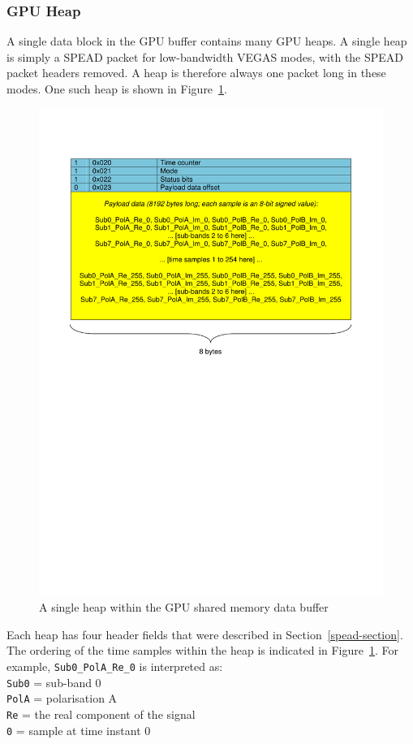 \documentclass[11pt]{article} %
\begin{document}
\subsubsection{GPU Heap}

A single data block in the GPU buffer contains many GPU heaps. A single heap is simply a SPEAD packet for low-bandwidth VEGAS modes, with the SPEAD packet headers removed. A heap is therefore always one packet long in these modes. One such heap is shown in Figure~\ref{vegas-gpu-heap}.

\begin{figure}[!ht]
\centering
\includegraphics*[width=13cm, viewport = 55 410 540 760]{figures/vegas-gpu-heap.pdf}
\caption{A single heap within the GPU shared memory data buffer}
\label{vegas-gpu-heap}
\end{figure}

Each heap has four header fields that were described in Section~\ref{spead-section}. The ordering of the time samples within the heap is indicated in Figure~\ref{vegas-gpu-heap}. For example, \texttt{Sub0\_PolA\_Re\_0} is interpreted as:\\
\texttt{Sub0}	= sub-band 0\\
\texttt{PolA}	= polarisation A\\
\texttt{Re}	= the real component of the signal\\
\texttt{0}	= sample at time instant 0\\
\end{document}
